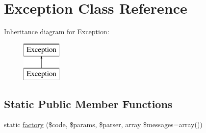 \hypertarget{class_p_e_a_r2_1_1_console_1_1_command_line_1_1_exception}{
\section{\-Exception \-Class \-Reference}
\label{class_p_e_a_r2_1_1_console_1_1_command_line_1_1_exception}
}
\-Inheritance diagram for \-Exception\-:\begin{figure}[H]
\begin{center}
\leavevmode
\includegraphics[height=2.000000cm]{class_p_e_a_r2_1_1_console_1_1_command_line_1_1_exception}
\end{center}
\end{figure}
\subsection*{\-Static \-Public \-Member \-Functions}
\begin{DoxyCompactItemize}
\item 
static \hyperlink{class_p_e_a_r2_1_1_console_1_1_command_line_1_1_exception_afc15e5c30381747d754e1bfe4b31912e}{factory} (\$code, \$params, \$parser, array \$messages=array())
\end{DoxyCompactItemize}
